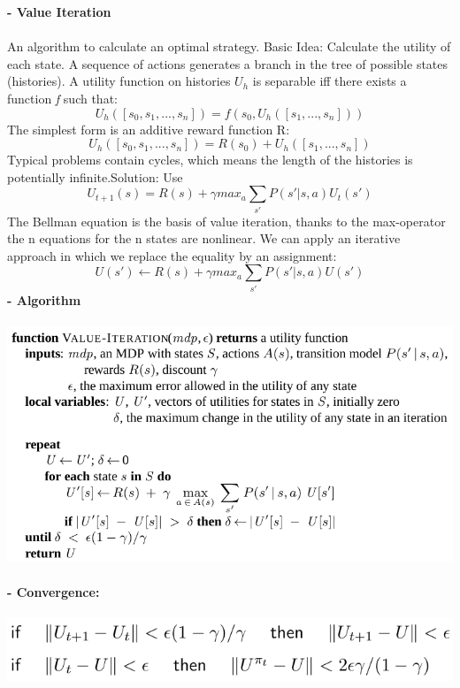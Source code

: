 \documentclass{article}
\begin{document}
\textbf{- Value Iteration}\\\\
An algorithm to calculate an optimal strategy. Basic Idea: Calculate the utility of each state. A sequence of actions generates a branch in the tree of possible states
(histories). A utility function on histories $U_h$ is separable iff there exists a function \textit{f} such that:\\
\begin{equation}
U_h([s_0,s_1,...,s_n])=f(s_0,U_h([s_1,...,s_n]))
\end{equation}
The simplest form is an additive reward function R:
\begin{equation}
U_h([s_0,s_1,...,s_n])=R(s_0)+U_h([s_1,...,s_n])
\end{equation}
Typical problems contain cycles, which means the length of the histories is potentially infinite.Solution: Use
\begin{equation}
U_{t+1}(s) = R(s) + \gamma max_a \sum_{s'}P(s'|s,a)U_t(s')
\end{equation}
The Bellman equation is the basis of value iteration, thanks to the max-operator the n equations for the n states are nonlinear. We can apply an iterative approach in which we replace the equality by an assignment:
\begin{equation}
U(s') \leftarrow R(s) + \gamma max_a \sum_{s'}P(s'|s,a)U(s')
\end{equation}
\textbf{- Algorithm}\\\\
\includegraphics[scale=0.5]{81.png}\\\\
\textbf{- Convergence:}\\\\
\includegraphics[scale=0.5]{82.png}\\\\
\end{document}

